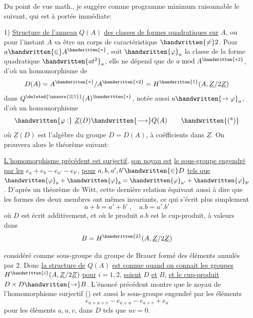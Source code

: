  Du point de vue math., je suggère comme programme minimum raisonnable le suivant, qui est à portée immédiate:

1) \uline{Structure de l'anneau} $Q(A)$ \uline{des classes de formes quadratiques sur} $A$, ou pour l'instant $A$ va être un corps de caractéristique $\handwritten{\ne}2$. Pour $a\handwritten{\in}A^{\handwritten{*}}$, soit $\handwritten{\varphi}_a$ la classe de la forme quadratique $\handwritten{at^2}_{a}$, elle ne dépend que de $a\bmod A^{\handwritten{*2}}$, d'où un homomorphisme de
\[
D(A)=A^{\handwritten{*}}/A^{\handwritten{*2}}=H^{\handwritten{1}}(A,\underline{Z}/2\underline{Z})
\]
dans $Q^{\deleted{\unsure{2|1}}}(A)^{\handwritten{*}}$, notée aussi $a\handwritten{\to\varphi}_a$, d'où un homomorphisme
\[
\handwritten{\varphi:}\ \underline{Z}(D)\handwritten{\longrightarrow}Q(A)
\tag*{\handwritten{(*)}}
\]
où $\underline{Z}(D)$ est l'algèbre du groupe $D=D(A)$, à coéfficients dans $\underline{Z}$. On prouvera alors le théorème suivant:

\uline{L'homomorphisme précédent est surjectif}, \uline{son noyau est}  \uline{le sous-groupe engendré par les} $e_a+e_b-e_{a'}-e_{b'}$, \uline{pour} $a,b,a',b'\handwritten{\in}D$ \uline{tels que} $\handwritten{\varphi}_a+\handwritten{\varphi}_b=\handwritten{\varphi}_{a'}+\handwritten{\varphi}_{b'}$. D'après un théorème de Witt, cette dernière relation équivaut aussi à dire que les formes des deux membres ont mêmes invariants, ce qui s'écrit plus simplement
\reversemarginpar
{}
\normalmarginpar
\[
a+b=a'+b'\ ,\quad a.b=a'.b'
\]
où $D$ est écrit additivement, et où le produit $a.b$ est le cup-produit, à valeurs dans
\[
B=H^{\handwritten{2}}(A,\underline{Z}/2\underline{Z})
\]

considéré comme sous-groupe du groupe de Brauer formé des éléments annulés par 2. Donc \uline{la structure de} $Q(A)$ \uline{est connue quand on connait les groupes} $H^{\handwritten{i}}(A,\underline{Z}/2\underline{Z})$ \uline{pour} $i=1,2$, \uline{soient} $D$ \uline{et} $B$, \uline{et le cup-produit} $D\times D\handwritten{\to}B$. L'énoncé précédent montre  que le noyau de l'homomorphisme surjectif (\handwritten{*}) est aussi le sous-groupe engendré par les éléments
\[
e_{a+u+v}-e_{a+u}-e_{a+v}+e_a
\]
pour les éléments $a,u,v$, dans $D$ tels que $uv=0$.

